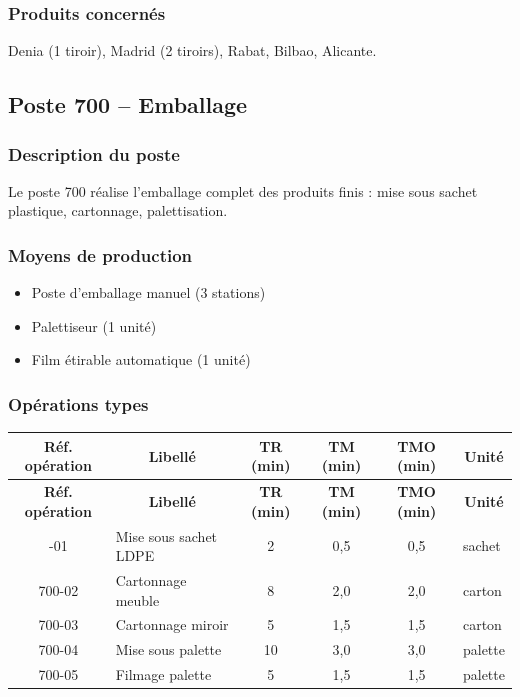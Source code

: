 \documentclass[12pt,a4paper]{article}
\begin{document}
\subsubsection{Produits concernés}
Denia (1 tiroir), Madrid (2 tiroirs), Rabat, Bilbao, Alicante.

\subsection{Poste 700 – Emballage}

\subsubsection{Description du poste}
Le poste 700 réalise l'emballage complet des produits finis : mise sous sachet plastique, cartonnage, palettisation.

\subsubsection{Moyens de production}
\begin{itemize}
    \item Poste d'emballage manuel (3 stations)
    \item Palettiseur (1 unité)
    \item Film étirable automatique (1 unité)
\end{itemize}

\subsubsection{Opérations types}

\begin{longtable}{|c|p{5cm}|c|c|c|p{3cm}|}
\hline
\multicolumn{1}{|c|}{\textbf{Réf. opération}} & \multicolumn{1}{c|}{\textbf{Libellé}} & \multicolumn{1}{c|}{\textbf{TR (min)}} & \multicolumn{1}{c|}{\textbf{TM (min)}} & \multicolumn{1}{c|}{\textbf{TMO (min)}} & \multicolumn{1}{c|}{\textbf{Unité}} \\
\hline
\endfirsthead
\hline
\multicolumn{1}{|c|}{\textbf{Réf. opération}} & \multicolumn{1}{c|}{\textbf{Libellé}} & \multicolumn{1}{c|}{\textbf{TR (min)}} & \multicolumn{1}{c|}{\textbf{TM (min)}} & \multicolumn{1}{c|}{\textbf{TMO (min)}} & \multicolumn{1}{c|}{\textbf{Unité}} \\
\hline
\endhead
\hline
\endfoot
700-01 & Mise sous sachet LDPE & 2 & 0,5 & 0,5 & sachet \\
700-02 & Cartonnage meuble & 8 & 2,0 & 2,0 & carton \\
700-03 & Cartonnage miroir & 5 & 1,5 & 1,5 & carton \\
700-04 & Mise sous palette & 10 & 3,0 & 3,0 & palette \\
700-05 & Filmage palette & 5 & 1,5 & 1,5 & palette \\
\hline
\end{longtable}
\end{document}
